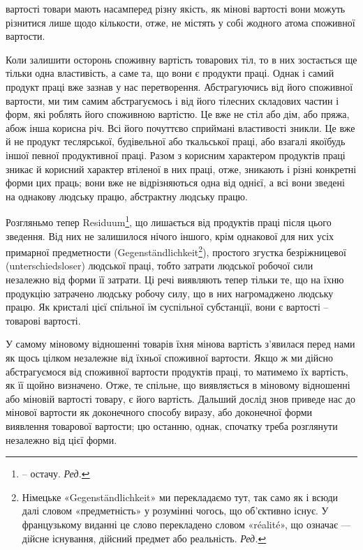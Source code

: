 \parcont{}  %
вартості товари мають насамперед різну якість, як мінові вартості
вони можуть різнитися лише щодо кількости, отже, не
містять у собі жодного атома споживної вартости.

Коли залишити осторонь споживну вартість товарових тіл,
то в них зостається ще тільки одна властивість, а саме та, що
вони є продукти праці. Однак і самий продукт праці вже зазнав
у нас перетворення. Абстрагуючись від його споживної вартости,
ми тим самим абстрагуємось і від його тілесних складових частин
і форм, які роблять його споживною вартістю. Це вже не стіл або
дім, або пряжа, абож інша корисна річ. Всі його почуттєво сприймані
властивості зникли. Це вже й не продукт теслярської, будівельної
або ткальської праці, або взагалі якоїбудь іншої певної
продуктивної праці. Разом з корисним характером продуктів
праці зникає й корисний характер втіленої в них праці, отже,
зникають і різні конкретні форми цих праць; вони вже не відрізняються
одна від однієї, а всі вони зведені на однакову людську
працю, абстрактну людську працю.

Розгляньмо тепер Residuum\footnote*{
-- остачу. \emph{Ред.}
}, що лишається від продуктів
праці після цього зведення. Від них не залишилося нічого іншого,
крім однакової для них усіх примарної предметности (Gegenständlichkeit\footnote*{
Німецьке «Gegenständlichkeit» ми перекладаємо тут, так само як
і всюди далі словом «предметність» у розумінні чогось, що об’єктивно
існує. У французькому виданні це слово перекладено словом «réalité»,
що означає — дійсне існування, дійсний предмет або реальність. \emph{Ред.}
}),
простого згустка безріжницевої (unterschiedsloser)
людської праці, тобто затрати людської робочої сили незалежно
від форми її затрати. Ці речі виявляють тепер тільки те,
що на їхню продукцію затрачено людську робочу силу, що в них
нагромаджено людську працю. Як кристалі цієї спільної їм суспільної
субстанції, вони є вартості -- товарові вартості.

У самому міновому відношенні товарів їхня мінова вартість
з’явилася перед нами як щось цілком незалежне від їхньої споживної
вартости. Якщо ж ми дійсно абстрагуємося від споживної
вартости продуктів праці, то матимемо їх вартість, як її щойно
визначено. Отже, те спільне, що виявляється в міновому відношенні
або міновій вартості товару, є його вартість. Дальший дослід
знов приведе нас до мінової вартости як доконечного способу
виразу, або доконечної форми виявлення товарової вартости; цю
останню, однак, спочатку треба розглянути незалежно від цієї форми.

